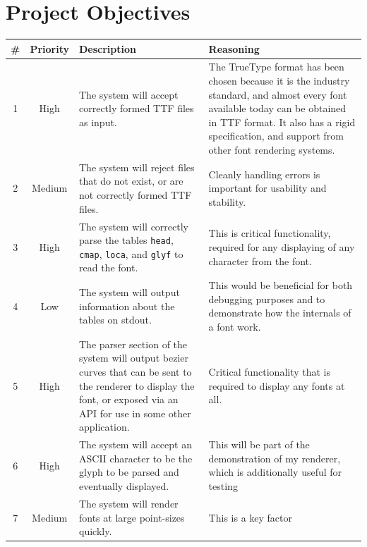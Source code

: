 \documentclass{report}
\begin{document}
\section{Project Objectives}
\begin{center}
  \begin{longtable}{c|c|p{3cm}|p{6.5cm}}
    \# & \textbf{Priority} & \textbf{Description} & \textbf{Reasoning} \\
    \hline
    1 & High & The system will accept correctly formed TTF files as input. & The TrueType format has been chosen because it is the industry standard, and almost every font available today can be obtained in TTF format. It also has a rigid specification, and support from other font rendering systems. \\
    \hline
    2 & Medium & The system will reject files that do not exist, or are not correctly formed TTF files. & Cleanly handling errors is important for usability and stability. \\
    \hline
    3 & High & The system will correctly parse the tables \texttt{head}, \texttt{cmap}, \texttt{loca}, and \texttt{glyf} to read the font. & This is critical functionality, required for any displaying of any character from the font. \\
    \hline
    4 & Low & The system will output information about the tables on stdout. & This would be beneficial for both debugging purposes and to demonstrate how the internals of a font work. \\
    \hline
    5 & High & The parser section of the system will output bezier curves that
               can be sent to the renderer to display the font, or exposed via
               an API for use in some other application. & Critical
                                                           functionality that is
                                                           required to display
                                                           any fonts at all. \\
    \hline
    6 & High & The system will accept an ASCII character to be the glyph to be
               parsed and eventually displayed. & This will be part of the
                                                  demonstration of my renderer,
                                                  which is additionally useful
                                                  for testing \\
    \hline
    7 & Medium & The system will render fonts at large point-sizes quickly.
                                                  & This is a key factor

\end{longtable}
\end{center}
\end{document}
